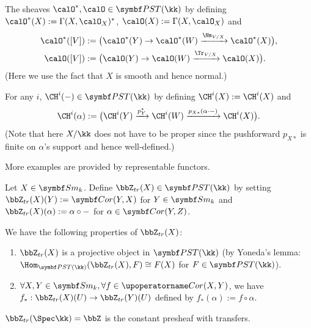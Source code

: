   \begin{example}
    The sheaves $\calO^*, \calO \in \PST(\kk)$ by defining $\calO^*(X) := \Gamma(X,\calO_X)^*$, $\calO(X) := \Gamma(X,\calO_X)$ and 
    \begin{align*}
      \calO^*([V]) & := \bigl( \calO^*(Y) \to \calO^*(W) \xrightarrow{\Nm_{V/X}} \calO^*(X) \bigr), \\
      \calO([V]) & := \bigl( \calO(Y) \to \calO(W) \xrightarrow{\Tr_{V/X}} \calO(X) \bigr).
    \end{align*}
    (Here we use the fact that $X$ is smooth and hence normal.)
  \end{example}

  \begin{example}
    For any $i$, $\CH^i(-) \in \PST(\kk)$ by defining $\CH^i(X) := \CH^i(X)$ and 
    \[ \CH^i(\alpha) := \bigl( \CH^i(Y) \xrightarrow{p_Y^*} \CH^i(W) \xrightarrow{p_{X*}(\alpha \cdot -)} \CH^i(X) \bigr). \]
    (Note that here $X/\kk$ does not have to be proper since the pushforward $p_{X*}$ is finite on $\alpha$'s support and hence well-defined.)
  \end{example}

  More examples are provided by representable functors.

  \begin{definition}
    Let $X\in \Sm_k$.
    Define $\bbZ_{tr}(X) \in \PST(\kk)$ by setting $\bbZ_{tr}(X)(Y) := \Cor(Y,X)$ for $Y \in \Sm_k$ and $\bbZ_{tr}(X)(\alpha) := \alpha \circ -$ for $\alpha \in \Cor(Y,Z)$.
  \end{definition}

  \begin{proposition}
    We have the following properties of $\bbZ_{tr}(X)$:
    \begin{enumerate}
      \item $\bbZ_{tr}(X)$ is a projective object in $\PST(\kk)$ (by Yoneda's lemma: $\Hom_{\PST(\kk)}(\bbZ_{tr}(X),F) \cong F(X)$ for $F\in \PST(\kk)$).
      \item $\forall X,Y\in \Sm_k, \forall f \in \Cone(X,Y)$, we have $f_* : \bbZ_{tr}(X)(U) \to \bbZ_{tr}(Y)(U)$ defined by $f_*(\alpha) := f \circ \alpha$.
    \end{enumerate}
  \end{proposition}

  \begin{example}
    $\bbZ_{tr}(\Spec \kk) = \bbZ$ is the constant presheaf with transfers.
  \end{example}

